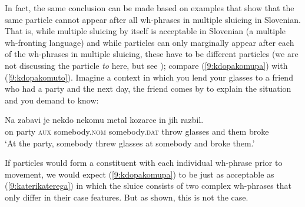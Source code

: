 \documentclass[output=paper,
modfonts,
newtxmath,
hidelinks
]{langscibook}
\begin{document}
\noindent In fact, the same conclusion can be made based on examples that show that the same particle cannot appear after all wh-phrases in multiple sluicing in Slovenian. That is, while multiple sluicing by itself is acceptable in Slovenian (a multiple wh-fronting language) and while particles can only marginally appear after each of the wh-phrases in multiple sluicing, these have to be different particles (we are not discussing the particle \textit{to} here, but see \citealt{marusicetal2015}); compare (\ref{9:kdopakomupa}) with (\ref{9:kdopakomuto}). Imagine a context in which you lend your glasses to a friend who had a party and the next day, the friend comes by to explain the situation and you demand to know:  

\begin{exe}
\ex \gll 
Na zabavi je nekdo nekomu metal kozarce in jih razbil. \\
on party \textsc{aux} somebody.\textsc{nom} somebody.\textsc{dat} throw glasses and them broke\\
\trans `At the party, somebody threw glasses at somebody and broke them.'

\ex \label{9:kdokomuvsi}\begin{xlist}
\label{9:kdokomu}
 \label{9:kdopakomupa}
\label{9:kdokomupa}
\label{9:kdopakomu}
\label{9:kdopakomuto}
\end{xlist}\end{exe}

\noindent If particles would form a constituent with each individual wh-phrase prior to movement, we would expect (\ref{9:kdopakomupa}) to be just as acceptable as (\ref{9:katerikaterega}) in which the sluice consists of two complex wh-phrases that only differ in their case features. But as shown, this is not the case. 
\end{document}
